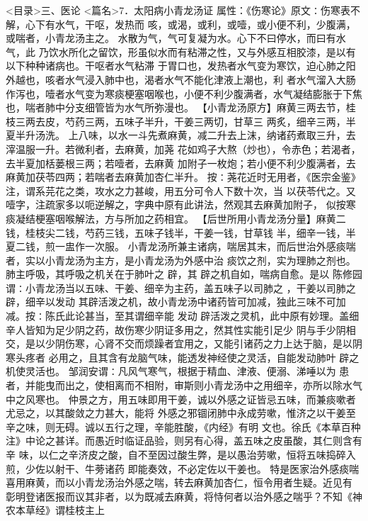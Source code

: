 \documentclass[a4paper,12pt,UTF8,twoside]{ctexbook}
\begin{document}
<目录>三、医论
<篇名>7．太阳病小青龙汤证
属性：《伤寒论》原文∶伤寒表不解，心下有水气，干呕，发热而 
咳，或渴，或利，或噎，或小便不利，少腹满，或喘者，小青龙汤主之。 
水散为气，气可复凝为水。心下不曰停水，而曰有水气，此 
乃饮水所化之留饮，形虽似水而有粘滞之性，又与外感互相胶漆，是以有以下种种诸病也。干呕者水气粘滞 
于胃口也，发热者水气变为寒饮，迫心肺之阳外越也，咳者水气浸入肺中也，渴者水气不能化津液上潮也，利 
者水气溜入大肠作泻也，噎者水气变为寒痰梗塞咽喉也，小便不利少腹满者，水气凝结膨胀于下焦 
也，喘者肺中分支细管皆为水气所弥漫也。 
【小青龙汤原方】麻黄三两去节，桂枝三两去皮，芍药三两，五味子半升，干姜三两切，甘草三 
两炙，细辛三两，半夏半升汤洗。 
上八味，以水一斗先煮麻黄，减二升去上沫，纳诸药煮取三升，去滓温服一升。若微利者，去麻黄，加荛 
花如鸡子大熬（炒也），令赤色；若渴者，去半夏加栝蒌根三两；若噎者，去麻黄 
加附子一枚炮；若小便不利少腹满者，去麻黄加茯苓四两；若喘者去麻黄加杏仁半升。 
按∶荛花近时无用者，《医宗金鉴》注，谓系芫花之类，攻水之力甚峻，用五分可令人下数十次，当 
以茯苓代之。又噎字，注疏家多以呃逆解之，字典中原有此讲法，然观其去麻黄加附子， 
似按寒痰凝结梗塞咽喉解法，方与所加之药相宜。 
【后世所用小青龙汤分量】麻黄二钱，桂枝尖二钱，芍药三钱，五味子钱半，干姜一钱，甘草钱 
半，细辛一钱，半夏二钱，煎一盅作一次服。 
小青龙汤所兼主诸病，喘居其末，而后世治外感痰喘者，实以小青龙汤为主方，是小青龙汤为外感中治 
痰饮之剂，实为理肺之剂也。肺主呼吸，其呼吸之机关在于肺叶之 辟，其 辟之机自如，喘病自愈。是以 
陈修园谓∶小青龙汤当以五味、干姜、细辛为主药，盖五味子以司肺之 ，干姜以司肺之辟，细辛以发动 
其辟活泼之机，故小青龙汤中诸药皆可加减，独此三味不可加减。按∶陈氏此论甚当，至其谓细辛能 
发动 辟活泼之灵机，此中原有妙理。盖细辛人皆知为足少阴之药，故伤寒少阴证多用之，然其性实能引足少 
阴与手少阴相交，是以少阴伤寒，心肾不交而烦躁者宜用之，又能引诸药之力上达于脑，是以阴寒头疼者 
必用之，且其含有龙脑气味，能透发神经使之灵活，自能发动肺叶 辟之机使灵活也。 
邹润安谓∶凡风气寒气，根据于精血、津液、便溺、涕唾以为 
患者，并能曳而出之，使相离而不相附，审斯则小青龙汤中之用细辛，亦所以除水气中之风寒也。 
仲景之方，用五味即用干姜，诚以外感之证皆忌五味，而兼痰嗽者尤忌之，以其酸敛之力甚大，能将 
外感之邪锢闭肺中永成劳嗽，惟济之以干姜至辛之味，则无碍。诚以五行之理，辛能胜酸，《内经》有明 
文也。徐氏《本草百种注》中论之甚详。而愚近时临证品验，则另有心得，盖五味之皮虽酸，其仁则含有辛 
味，以仁之辛济皮之酸，自不至因过酸生弊，是以愚治劳嗽，恒将五味捣碎入煎，少佐以射干、牛蒡诸药 
即能奏效，不必定佐以干姜也。 
特是医家治外感痰喘喜用麻黄，而以小青龙汤治外感之喘，转去麻黄加杏仁，恒令用者生疑。近见有 
彰明登诸医报而议其非者，以为既减去麻黄，将恃何者以治外感之喘乎？不知《神农本草经》谓桂枝主上 
\end{document}
